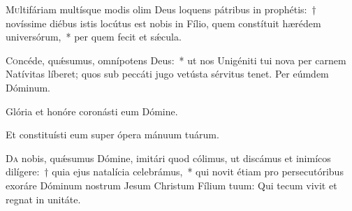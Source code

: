 \documentclass[vesperale_romanum.tex]{subfiles}
\begin{document}
\label{cap_2_vesperis_nativitatis_dom} \capitulum


\lettrine{M}{u}ltifáriam multísque modis olim Deus loquens pátribus in prophétis:~† novíssime diébus istis locútus est nobis in Fílio, quem constítuit hærédem universórum,~* per quem fecit et sǽcula.




\admagnificat \label{hodie_christus_natus_est}

\oratio


\lettrine{C}{o}ncéde, quǽsumus, omnípotens Deus:~* ut nos Unigéniti tui nova per carnem Natívitas líberet; quos sub peccáti jugo vetústa sérvitus tenet.
Per eúmdem Dóminum.




\vv Glória et honóre coronásti eum Dómine.

\rr Et constituísti eum super ópera mánuum tuárum.

\oratio \label{oratio_s_stephani_dec_26}

\lettrine{D}{a} nobis, quǽsumus Dómine, imitári quod cólimus, ut discámus et inimícos dilígere:~† quia ejus natalícia celebrámus,~* qui novit étiam pro persecutóribus exoráre Dóminum nostrum Jesum Christum Fílium tuum: Qui tecum vivit et regnat in unitáte.

 \label{dec_26}



\end{document}
